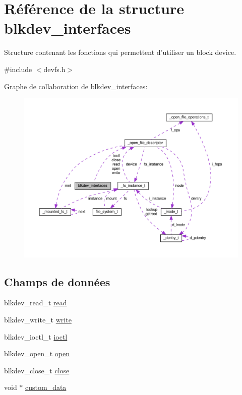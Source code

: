 \hypertarget{structblkdev__interfaces}{\section{Référence de la structure blkdev\+\_\+interfaces}
\label{structblkdev__interfaces}
}


Structure contenant les fonctions qui permettent d'utiliser un block device.  




{\ttfamily \#include $<$devfs.\+h$>$}



Graphe de collaboration de blkdev\+\_\+interfaces\+:
\nopagebreak
\begin{figure}[H]
\begin{center}
\leavevmode
\includegraphics[width=350pt]{structblkdev__interfaces__coll__graph}
\end{center}
\end{figure}
\subsection*{Champs de données}
\begin{DoxyCompactItemize}
\item 
blkdev\+\_\+read\+\_\+t \hyperlink{structblkdev__interfaces_ad14a2ad714105cdb8ce002eb4fb9e747}{read}
\item 
blkdev\+\_\+write\+\_\+t \hyperlink{structblkdev__interfaces_ae99fb7e1529ef6c24df9dc454bc0f9f6}{write}
\item 
blkdev\+\_\+ioctl\+\_\+t \hyperlink{structblkdev__interfaces_ae93720624e6f1a1ea33e31bf1da4c097}{ioctl}
\item 
blkdev\+\_\+open\+\_\+t \hyperlink{structblkdev__interfaces_a08eaa39b105826d2780991b32577867a}{open}
\item 
blkdev\+\_\+close\+\_\+t \hyperlink{structblkdev__interfaces_ab7623005e31211894853b3524e1e74eb}{close}
\item 
void $\ast$ \hyperlink{structblkdev__interfaces_a8eea79e70042c41cc171796b501a9fd1}{custom\+\_\+data}
\end{DoxyCompactItemize}


